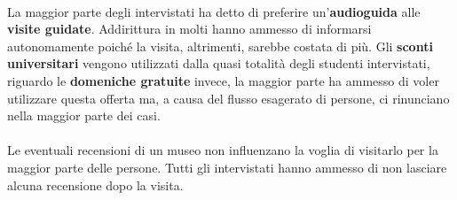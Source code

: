 \paragraph{}
La maggior parte degli intervistati ha detto di preferire un'\textbf{audioguida} alle \textbf{visite guidate}. Addirittura in molti hanno ammesso di informarsi autonomamente poiché la visita, altrimenti, sarebbe costata di più.
\newline
Gli \textbf{sconti universitari} vengono utilizzati dalla quasi totalità degli studenti intervistati, riguardo le \textbf{domeniche gratuite} invece, la maggior parte ha ammesso di voler utilizzare questa offerta ma, a causa del flusso esagerato di persone, ci rinunciano nella maggior parte dei casi.

\paragraph{}
Le eventuali recensioni di un museo non influenzano la voglia di visitarlo per la maggior parte delle persone. Tutti gli intervistati hanno ammesso di non lasciare alcuna recensione dopo la visita.


